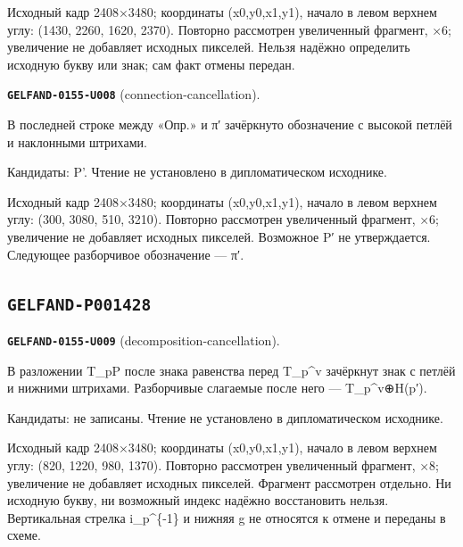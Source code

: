 Исходный кадр 2408×3480; координаты (x0,y0,x1,y1), начало в левом верхнем углу: (1430, 2260, 1620, 2370). Повторно рассмотрен увеличенный фрагмент, ×6; увеличение не добавляет исходных пикселей. Нельзя надёжно определить исходную букву или знак; сам факт отмены передан.\par
\medskip
\par\noindent\leavevmode{}\label{GELFAND-0155-U008}\label{GELFAND-P001427:connection-cancellation}\textbf{\texttt{GELFAND-0155-U008}} (connection-cancellation).\nopagebreak[4]\par
В последней строке между «Опр.» и π′ зачёркнуто обозначение с высокой петлёй и наклонными штрихами.\par
Кандидаты: P'. Чтение не установлено в дипломатическом исходнике.\par
Исходный кадр 2408×3480; координаты (x0,y0,x1,y1), начало в левом верхнем углу: (300, 3080, 510, 3210). Повторно рассмотрен увеличенный фрагмент, ×6; увеличение не добавляет исходных пикселей. Возможное P′ не утверждается. Следующее разборчивое обозначение — π′.\par
\medskip
\subsection*{\texttt{GELFAND-P001428}}
\par\noindent\leavevmode{}\label{GELFAND-0155-U009}\label{GELFAND-P001428:decomposition-cancellation}\textbf{\texttt{GELFAND-0155-U009}} (decomposition-cancellation).\nopagebreak[4]\par
В разложении T\_pP после знака равенства перед T\_p\textasciicircum{}v зачёркнут знак с петлёй и нижними штрихами. Разборчивые слагаемые после него — T\_p\textasciicircum{}v⊕H(p′).\par
Кандидаты: не записаны. Чтение не установлено в дипломатическом исходнике.\par
Исходный кадр 2408×3480; координаты (x0,y0,x1,y1), начало в левом верхнем углу: (820, 1220, 980, 1370). Повторно рассмотрен увеличенный фрагмент, ×8; увеличение не добавляет исходных пикселей. Фрагмент рассмотрен отдельно. Ни исходную букву, ни возможный индекс надёжно восстановить нельзя. Вертикальная стрелка i\_p\textasciicircum{}\{-1\} и нижняя g не относятся к отмене и переданы в схеме.\par
\medskip
